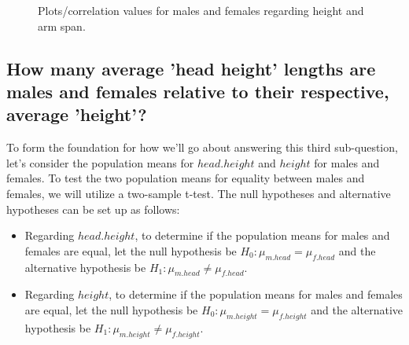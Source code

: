 \documentclass[]{article}
\begin{document}
\begin{figure}[!ht]
    \begin{center}
        \caption{Plots/correlation values for males and females regarding height and arm span.}
        \label{fig:sq1}
    \end{center}
\end{figure}

\subsection{How many average 'head height' lengths are males and females relative to their respective, average 'height'?}
\label{sec:rq4}

To form the foundation for how we'll go about answering this third
sub-question, let's consider the population means for \(head.height\)
and \(height\) for males and females. To test the two population means
for equality between males and females, we will utilize a two-sample
t-test. The null hypotheses and alternative hypotheses can be set up as
follows:

\begin{itemize}
\item
  Regarding \(head.height\), to determine if the population means for
  males and females are equal, let the null hypothesis be
  \(H_0: \mu_{m.head}=\mu_{f.head}\) and the alternative hypothesis be
  \(H_1: \mu_{m.head} \neq \mu_{f.head}\).
\item
  Regarding \(height\), to determine if the population means for males
  and females are equal, let the null hypothesis be
  \(H_0: \mu_{m.height}=\mu_{f.height}\) and the alternative hypothesis
  be \(H_1: \mu_{m.height} \neq \mu_{f.height}\).
\end{itemize}
\end{document}
